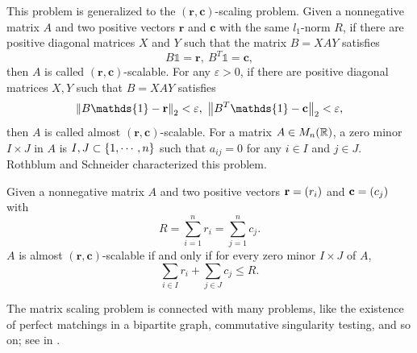 \documentclass[suri,pdfbookmark]{engsuribt} %
\begin{document}
  This problem is generalized to the $(\mathbf{r},\mathbf{c})$-scaling problem. Given a nonnegative matrix $A$ and two positive vectors $\mathbf{r}$ and $\mathbf{c}$ with the same $l_1$-norm $R$, if there are positive diagonal matrices $X$ and $Y$ such that the matrix $B = XAY$ satisfies
  \begin{equation*}
    B\mathds{1} = \mathbf{r},~B^T\mathds{1} = \mathbf{c},
  \end{equation*}
  then $A$ is called $(\mathbf{r},\mathbf{c})$-scalable. For any $\varepsilon > 0$, if there are positive diagonal matrices $X,Y$ such that $B = XAY$ satisfies
  \begin{equation*}
    \norm{B\mathds{1}- \mathbf{r}}_2 < \varepsilon,~\norm{B^T\mathds{1}- \mathbf{c}}_2 < \varepsilon,
  \end{equation*}
  then $A$ is called almost $(\mathbf{r},\mathbf{c})$-scalable. For a matrix $A \in M_n(\mathbb{R})$, a zero minor $I \times J$ in $A$ is $I,J \subset \left\{1,\cdots,n\right\}$ such that  $a_{ij}=0$ for any $i\in I$ and $j \in J$. Rothblum and Schneider characterized this problem.
  \begin{thm}
    Given a nonnegative matrix $A$ and two positive vectors $\mathbf{r}=\left(r_i\right)$ and $\mathbf{c}=\left(c_j\right)$ with
    \begin{equation*}
      R = \sum_{i=1}^n r_i = \sum_{j=1}^n c_j.
    \end{equation*}
    $A$ is almost $(\mathbf{r},\mathbf{c})$-scalable if and only if for every zero minor $I \times J$ of $A$, 
    \begin{equation*}
      \sum_{i \in I}r_i + \sum_{j \in J}c_j \leqslant R.
    \end{equation*}
  \end{thm}
  The matrix scaling problem is connected with many problems, like the existence of perfect matchings in a bipartite graph, commutative singularity testing, and so on; see in \cite{key18}.
\end{document}

